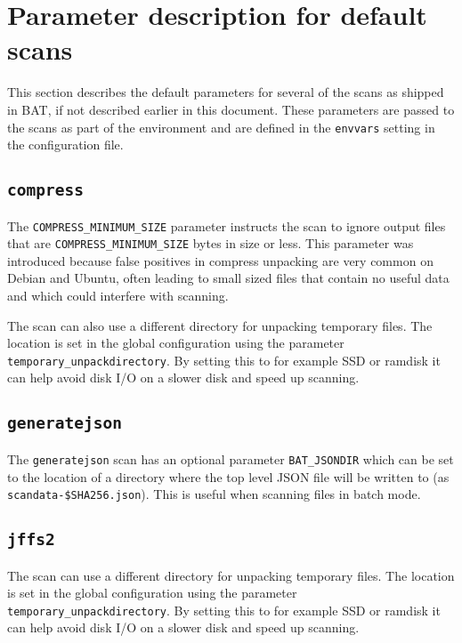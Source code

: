 \documentclass[10pt,a4paper]{article}
\begin{document}
\section{Parameter description for default scans}

This section describes the default parameters for several of the scans as
shipped in BAT, if not described earlier in this document. These parameters are
passed to the scans as part of the environment and are defined in the
\texttt{envvars} setting in the configuration file.

\subsection{\texttt{compress}}

The \texttt{COMPRESS\_MINIMUM\_SIZE} parameter instructs the scan to ignore
output files that are \texttt{COMPRESS\_MINIMUM\_SIZE} bytes in size or less.
This parameter was introduced because false positives in compress unpacking are
very common on Debian and Ubuntu, often leading to small sized files that
contain no useful data and which could interfere with scanning.

The scan can also use a different directory for unpacking temporary files.
The location is set in the global configuration using the parameter
\texttt{temporary\_unpackdirectory}. By setting this to for example SSD or
ramdisk it can help avoid disk I/O on a slower disk and speed up scanning.

\subsection{\texttt{generatejson}}

The \texttt{generatejson} scan has an optional parameter \texttt{BAT\_JSONDIR}
which can be set to the location of a directory where the top level JSON file
will be written to (as \texttt{scandata-\$SHA256.json}). This is useful when
scanning files in batch mode.

\subsection{\texttt{jffs2}}

The scan can use a different directory for unpacking temporary files.
The location is set in the global configuration using the parameter
\texttt{temporary\_unpackdirectory}. By setting this to for example SSD or
ramdisk it can help avoid disk I/O on a slower disk and speed up scanning.
\end{document}
